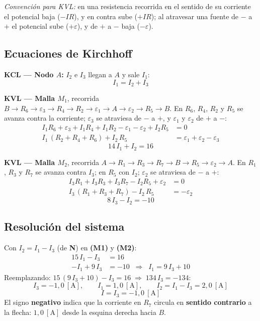 \documentclass[12pt,letterpaper]{article}
\begin{document}
\noindent\textit{Convenci\'on para KVL:} en una resistencia recorrida en el sentido de su corriente el
potencial baja ($-IR$), y en contra sube ($+IR$); al atravesar una fuente de $-$ a $+$ el potencial
sube ($+\varepsilon$), y de $+$ a $-$ baja ($-\varepsilon$).

\subsection*{Ecuaciones de Kirchhoff}

\textbf{KCL --- Nodo $A$:} $I_2$ e $I_3$ llegan a $A$ y sale $I_1$:
\[
    \boxed{I_1 = I_2 + I_3} \tag{N}
\]

\textbf{KVL --- Malla $M_1$}, recorrida $B\to R_6\to\varepsilon_3\to R_4\to R_2\to\varepsilon_1\to A\to\varepsilon_2\to R_5\to B$.
En $R_6$, $R_4$, $R_2$ y $R_5$ se avanza contra la corriente; $\varepsilon_3$ se atraviesa de $-$ a
$+$, y $\varepsilon_1$ y $\varepsilon_2$ de $+$ a $-$:
\begin{align*}
    I_1R_6 + \varepsilon_3 + I_1R_4 + I_1R_2 - \varepsilon_1 - \varepsilon_2 + I_2R_5 &= 0\\[2pt]
    I_1\,(R_2+R_4+R_6) + I_2\,R_5 &= \varepsilon_1 + \varepsilon_2 - \varepsilon_3
\end{align*}
\[
    \boxed{14\,I_1 + I_2 = 16} \tag{M1}
\]

\textbf{KVL --- Malla $M_2$}, recorrida $A\to R_1\to R_3\to R_7\to B\to R_5\to\varepsilon_2\to A$.
En $R_1$, $R_3$ y $R_7$ se avanza contra $I_3$; en $R_5$ con $I_2$; $\varepsilon_2$ se atraviesa
de $-$ a $+$:
\begin{align*}
    I_3R_1 + I_3R_3 + I_3R_7 - I_2R_5 + \varepsilon_2 &= 0\\[2pt]
    I_3\,(R_1+R_3+R_7) - I_2\,R_5 &= -\varepsilon_2
\end{align*}
\[
    \boxed{8\,I_3 - I_2 = -10} \tag{M2}
\]

\subsection*{Resoluci\'on del sistema}

Con $I_2 = I_1 - I_3$ (de \textbf{N}) en \textbf{(M1)} y \textbf{(M2)}:
\begin{align*}
    15\,I_1 - I_3 &= 16\\[2pt]
    -I_1 + 9\,I_3 &= -10 \;\;\Rightarrow\;\; I_1 = 9\,I_3 + 10
\end{align*}
Reemplazando: $15\,(9\,I_3 + 10) - I_3 = 16 \;\Rightarrow\; 134\,I_3 = -134$:
\[
    I_3 = -1{,}0\ [\text{A}],\qquad I_1 = 1{,}0\ [\text{A}],\qquad I_2 = I_1 - I_3 = 2{,}0\ [\text{A}]
\]
\[
    \boxed{I = I_3 = -1{,}0\ [\text{A}]}
\]
El signo \textbf{negativo} indica que la corriente en $R_7$ circula en \textbf{sentido contrario} a la
flecha: $1{,}0\ [\text{A}]$ desde la esquina derecha hacia $B$.
\end{document}
